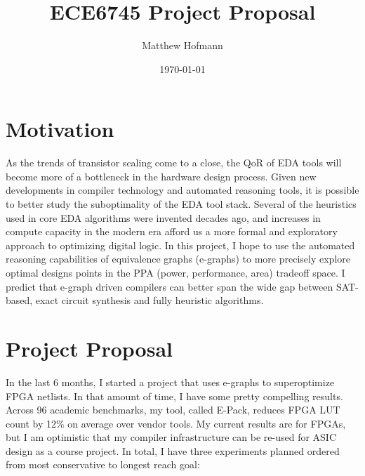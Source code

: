 \documentclass[10pt,letterpaper]{article}
\title{ECE6745 Project Proposal}
\author{Matthew Hofmann}
\date{\today}
\begin{document}
\maketitle

\section{Motivation}\label{sec:motivation}

As the trends of transistor scaling come to a close, the QoR of EDA tools will
become more of a bottleneck in the hardware design process. Given new
developments in compiler technology and automated reasoning tools, it is
possible to better study the suboptimality of the EDA tool stack. Several of
the heuristics used in core EDA algorithms were invented decades ago, and
increases in compute capacity in the modern era afford us a more formal and
exploratory approach to optimizing digital logic. In this project, I hope to
use the automated reasoning capabilities of equivalence graphs (e-graphs) to
more precisely explore optimal designs points in the PPA (power, performance,
area) tradeoff space. I predict that e-graph driven compilers can better span
the wide gap between SAT-based, exact circuit synthesis and fully heuristic
algorithms.

\section{Project Proposal}\label{sec:intro}

In the last 6 months, I started a project that uses e-graphs to superoptimize
FPGA netlists. In that amount of time, I have some pretty compelling results.
Across 96 academic benchmarks, my tool, called E-Pack, reduces FPGA LUT count
by 12\% on average over vendor tools. My current results are for FPGAs, but I
am optimistic that my compiler infrastructure can be re-used for ASIC design as
a course project. In total, I have three experiments planned ordered from most
conservative to longest reach goal:
\end{document}
